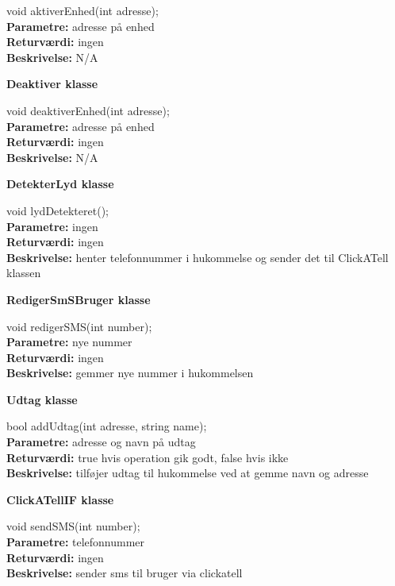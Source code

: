 void aktiverEnhed(int adresse); \\
\textbf{Parametre:} adresse på enhed \\
\textbf{Returværdi:} ingen \\
\textbf{Beskrivelse:} N/A \\

{\centering 
\textbf{Deaktiver klasse}\par
}

void deaktiverEnhed(int adresse); \\
\textbf{Parametre:} adresse på enhed \\
\textbf{Returværdi:} ingen \\
\textbf{Beskrivelse:} N/A \\

{\centering 
\textbf{DetekterLyd klasse}\par
}

void lydDetekteret(); \\
\textbf{Parametre:} ingen \\
\textbf{Returværdi:} ingen \\
\textbf{Beskrivelse:} henter telefonnummer i hukommelse og sender det til ClickATell klassen \\

{\centering 
\textbf{RedigerSmSBruger klasse}\par
}

void redigerSMS(int number); \\
\textbf{Parametre:} nye nummer \\
\textbf{Returværdi:} ingen \\
\textbf{Beskrivelse:} gemmer nye nummer i hukommelsen \\

{\centering 
\textbf{Udtag klasse}\par
}

bool addUdtag(int adresse, string name); \\
\textbf{Parametre:} adresse og navn på udtag \\
\textbf{Returværdi:} true hvis operation gik godt, false hvis ikke \\
\textbf{Beskrivelse:} tilføjer udtag til hukommelse ved at gemme navn og adresse \\

{\centering 
\textbf{ClickATellIF klasse}\par
}

void sendSMS(int number); \\
\textbf{Parametre:} telefonnummer \\
\textbf{Returværdi:} ingen \\
\textbf{Beskrivelse:} sender sms til bruger via clickatell \\

